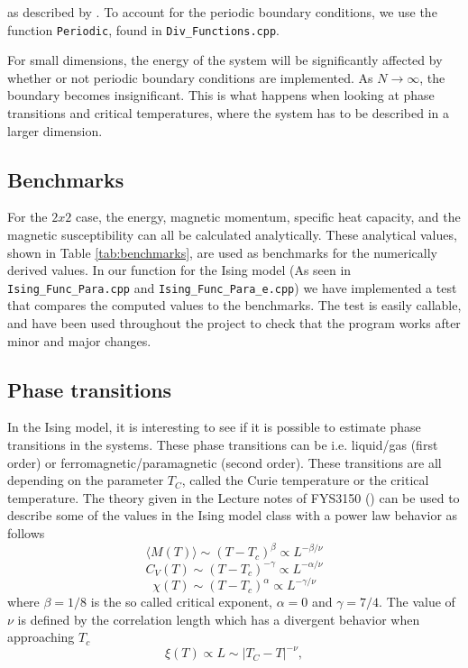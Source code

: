 \documentclass[12pt,english,a4paper]{article}
\begin{document}
\noindent as described by \cite{Lec15}. To account for the periodic boundary conditions, we use the function \texttt{Periodic}, found in \texttt{Div\_Functions.cpp}.

For small dimensions, the energy of the system will be significantly affected by whether or not periodic boundary conditions are implemented. As $N \rightarrow \infty$, the boundary becomes insignificant. This is what happens when looking at phase transitions and critical temperatures, where the system has to be described in a larger dimension.

\subsection{Benchmarks}

For the $2x2$ case, the energy, magnetic momentum, specific heat capacity, and the magnetic susceptibility can all be calculated analytically. These analytical values, shown in Table \ref{tab:benchmarks}, are used as benchmarks for the numerically derived values. In our function for the Ising model (As seen in \texttt{Ising\_Func\_Para.cpp} and \texttt{Ising\_Func\_Para\_e.cpp}) we have implemented a test that compares the computed values to the benchmarks. The test is easily callable, and have been used throughout the project to check that the program works after  minor and major changes. 

\subsection{Phase transitions}
In the Ising model, it is interesting to see if it is possible to estimate phase transitions in the systems. These phase transitions can be i.e. liquid/gas (first order) or ferromagnetic/paramagnetic (second order). These transitions are all depending on the parameter $T_C$, called the Curie temperature or the critical temperature. The theory given in the Lecture notes of FYS3150 (\cite{LectureIsing}) can be used to describe some of the values in the Ising model class with a power law behavior as follows
\begin{equation}
    \langle M(T)\rangle\sim (T-T_c)^\beta \propto L^{-\beta/\nu}
\end{equation}
\begin{equation}
    C_V(T)\sim (T-T_c)^{-\gamma} \propto L^{-\alpha/\nu}
\end{equation}
\begin{equation}
    \chi(T)\sim (T-T_c)^\alpha \propto L^{-\gamma/\nu}
\end{equation}
where $\beta = 1/8$ is the so called critical exponent, $\alpha = 0$ and $\gamma = 7/4$. The value of $\nu$ is defined by the correlation length which has a divergent behavior when approaching $T_c$
\begin{equation}
      \xi(T) \propto L \sim \left|T_C-T\right|^{-\nu},
  \label{eq:xi}
\end{equation}
\end{document}
